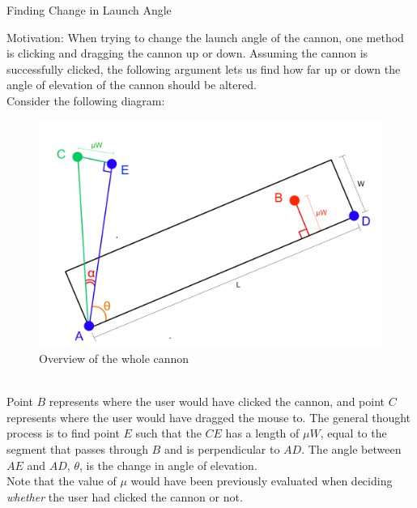 \documentclass{article}
\begin{document}
\begin{center} \huge Finding Change in Launch Angle \\
\end{center}
Motivation: When trying to change the launch angle of the cannon, one method is clicking and dragging the cannon up or down. Assuming the cannon is successfully clicked, the following argument lets us find how far up or down the angle of elevation of the cannon should be altered.\vspace{\baselineskip}\\
Consider the following diagram: \vspace{\baselineskip}\\
\begin{figure}[h]
	\centering	
	\includegraphics[scale=0.08]{Images/DragFunction1.png}
	\caption{Overview of the whole cannon}
\end{figure} \vspace{\baselineskip}\\
Point $B$ represents where the user would have clicked the cannon, and point $C$ represents where the user would have dragged the mouse to. The general thought process is to find point $E$ such that the $CE$ has a length of $\mu W$, equal to the segment that passes through $B$ and is perpendicular to $AD$. The angle between $AE$ and $AD$, $\theta$, is the change in angle of elevation. \vspace{\baselineskip}\\
Note that the value of $\mu$ would have been previously evaluated when deciding \emph{whether} the user had clicked the cannon or not.\vspace{\baselineskip}\\
\end{document}
